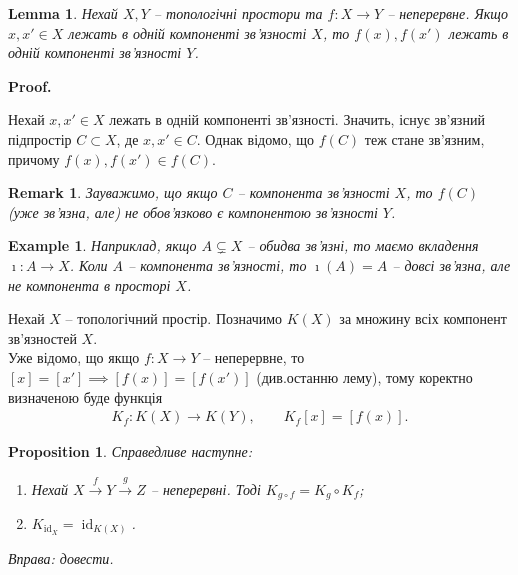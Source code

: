 \documentclass[a4paper, 10pt]{article}
\makeatletter
\theoremstyle{theoremdd}
\newtheorem{example}[theorem]{Example}
\newtheorem{proposition}[theorem]{Proposition}
\newtheorem{remark}[theorem]{Remark}
\newtheorem{lemma}[theorem]{Lemma}
\DeclareMathOperator{\id}{id}
\renewenvironment{proof}[1][Proof.\\]{\par
\pushQED{\hfill \qed}%
\normalfont \topsep6\p@\@plus6\p@\relax
\trivlist
\item\relax
{\bfseries
#1\@addpunct{.}}\hspace\labelsep\ignorespaces
}{%
\popQED\endtrivlist\@endpefalse
}
\makeatother
\begin{document}
\begin{lemma}
Нехай $X,Y$ -- топологічні простори та $f \colon X \to Y$ -- неперервне. Якщо $x,x' \in X$ лежать в одній компоненті зв'язності $X$, то $f(x),f(x')$ лежать в одній компоненті зв'язності $Y$.
\end{lemma}

\begin{proof}
Нехай $x,x' \in X$ лежать в одній компоненті зв'язності. Значить, існує зв'язний підпростір $C \subset X$, де $x,x' \in C$. Однак відомо, що $f(C)$ теж стане зв'язним, причому $f(x),f(x') \in f(C)$. 
\end{proof}

\begin{remark}
Зауважимо, що якщо $C$ -- компонента зв'язності $X$, то $f(C)$ (уже зв'язна, але) не обов'язково є компонентою зв'язності $Y$.
\end{remark}

\begin{example}
Наприклад, якщо $A \subsetneq X$ -- обидва зв'язні, то маємо вкладення $\imath \colon A \to X$. Коли $A$ -- компонента зв'язності, то $\imath(A) = A$ -- довсі зв'язна, але не компонента в просторі $X$.
\end{example}

\noindent
Нехай $X$ -- топологічний простір. Позначимо $K(X)$ за множину всіх компонент зв'язностей $X$.\\
Уже відомо, що якщо $f \colon X \to Y$ -- неперервне, то $[x] = [x'] \implies [f(x)] = [f(x')]$ (див.\@ останню лему), тому коректно визначеною буде функція
\begin{align*}
K_f \colon K(X) \to K(Y), \qquad K_f[x] = [f(x)].
\end{align*}

\begin{proposition}
Справедливе наступне:
\begin{enumerate}[nosep,wide=0pt,label={\arabic*)}]
\item Нехай $X \overset{f}{\to} Y \overset{g}{\to} Z$ -- неперервні. Тоді $K_{g \circ f} = K_g \circ K_f$;
\item $K_{\id_X} = \id_{K(X)}$.
\end{enumerate}
\textit{Вправа: довести.}
\end{proposition}
\end{document}
